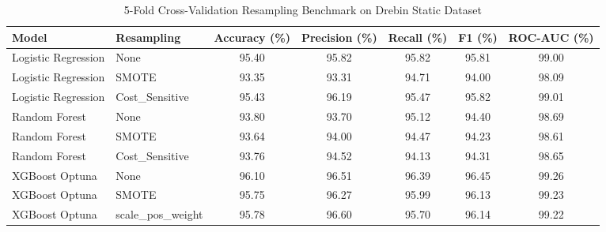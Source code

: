 \begin{table}[t]
\centering
\caption{5-Fold Cross-Validation Resampling Benchmark on Drebin Static Dataset}
\label{tab:resampling_benchmark}
\begin{tabular}{llccccc}
\hline
\textbf{Model} & \textbf{Resampling} & \textbf{Accuracy (\%)} & \textbf{Precision (\%)} & \textbf{Recall (\%)} & \textbf{F1 (\%)} & \textbf{ROC-AUC (\%)} \\
\hline
Logistic Regression & None & 95.40 & 95.82 & 95.82 & 95.81 & 99.00 \\
Logistic Regression & SMOTE & 93.35 & 93.31 & 94.71 & 94.00 & 98.09 \\
Logistic Regression & Cost\_Sensitive & 95.43 & 96.19 & 95.47 & 95.82 & 99.01 \\
Random Forest & None & 93.80 & 93.70 & 95.12 & 94.40 & 98.69 \\
Random Forest & SMOTE & 93.64 & 94.00 & 94.47 & 94.23 & 98.61 \\
Random Forest & Cost\_Sensitive & 93.76 & 94.52 & 94.13 & 94.31 & 98.65 \\
XGBoost Optuna & None & 96.10 & 96.51 & 96.39 & 96.45 & 99.26 \\
XGBoost Optuna & SMOTE & 95.75 & 96.27 & 95.99 & 96.13 & 99.23 \\
XGBoost Optuna & scale\_pos\_weight & 95.78 & 96.60 & 95.70 & 96.14 & 99.22 \\
\hline
\end{tabular}
\end{table}
